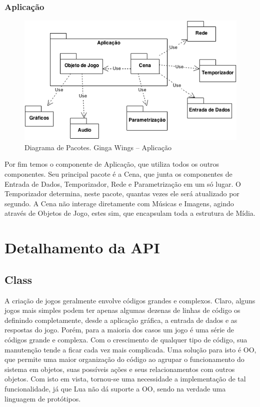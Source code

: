 \documentclass[
	12pt,				%
	openright,			%
	oneside,			%
	a4paper,			%
	brazil,				%
	]{abntex2}
\begin{document}
\subsubsection{Aplicação}

\begin{figure}
\centering
\includegraphics{diagrama_aplicacao.png}
\caption{Diagrama de Pacotes. Ginga Wings – Aplicação}
\label{fig:diagramaAplicacao}
\end{figure}

Por fim temos o componente de Aplicação, que utiliza todos os outros componentes. Seu principal pacote é a Cena, que junta os componentes de Entrada de Dados, Temporizador, Rede e Parametrização em um só lugar. O Temporizador determina, neste pacote, quantas vezes ele será atualizado por segundo. A Cena não interage diretamente com Músicas e Imagens, agindo através de Objetos de Jogo, estes sim, que encapsulam toda a estrutura de Mídia. 

\section{Detalhamento da API}

\subsection{Class}

A criação de jogos geralmente envolve códigos grandes e complexos. Claro, alguns jogos mais simples podem ter apenas algumas dezenas de linhas de código os definindo completamente, desde a aplicação gráfica, a entrada de dados e as respostas do jogo. Porém, para a maioria dos casos um jogo é uma série de códigos grande e complexa. Com o crescimento de qualquer tipo de código, sua manutenção tende a ficar cada vez mais complicada. Uma solução para isto é OO, que permite uma maior organização do código ao agrupar o funcionamento do sistema em objetos, suas possíveis ações e seus relacionamentos com outros objetos. Com isto em vista, tornou-se uma necessidade a implementação de tal funcionalidade, já que Lua não dá suporte a OO, sendo na verdade uma linguagem de protótipos.
\end{document}
